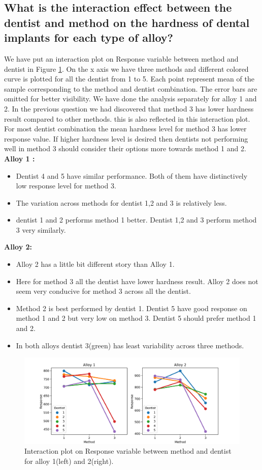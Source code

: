 \documentclass[12pt,a4paper]{style}
\begin{document}
	\subsection{ What is the interaction effect between the dentist and method on the hardness of dental implants for each type of alloy?}
		We have put an interaction plot on Response variable between method and dentist in Figure \ref{fig:interaction-plot}. On the x axis we have three methods and different colored curve is plotted for all the dentist from 1 to 5. Each point represent mean of the sample corresponding to the method and dentist combination. The error bars are omitted for better visibility. We have done the analysis separately for alloy 1 and 2. In the previous question we had discovered that method 3 has lower hardness result compared to other methods. this is also reflected in this interaction plot. For most dentist combination the mean hardness level for method 3 has lower response value. If higher hardness level is desired then dentists not performing well in method 3 should consider their options more towards method 1 and 2. \\
		\textbf{Alloy 1 :}
		\begin{itemize}
			\item Dentist 4 and 5 have similar performance. Both of them have distinctively low response level for method 3.
			\item The variation across methods for dentist 1,2 and 3 is relatively less. 
			\item dentist 1 and 2 performs method 1 better. Dentist 1,2 and 3 perform method 3 very similarly. 
		\end{itemize} 
		\textbf{Alloy 2:}
		\begin{itemize}
			\item Alloy 2 has a little bit different story than Alloy 1.
			\item Here for method 3 all the dentist have lower hardness result. Alloy 2 does not seem very conducive for method 3 across all the dentist. 
			\item Method 2 is best performed by dentist 1. Dentist 5 have good response on method 1 and 2 but very low on method 3. Dentist 5 should prefer method 1 and 2.
			\item In both alloys dentist 3(green) has least variability across three methods.
		\end{itemize}
		\begin{figure}
		\centering
		\includegraphics[width=\textwidth]{interaction_plot.png}
		\caption{Interaction plot on Response variable between method and dentist for alloy 1(left) and 2(right).}
		\label{fig:interaction-plot}
	\end{figure}
\end{document}
